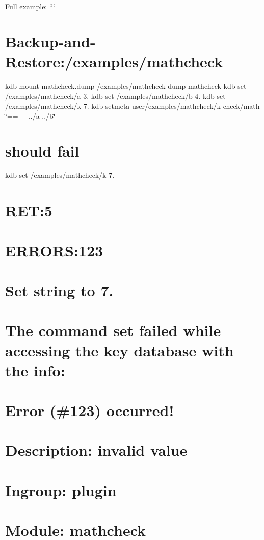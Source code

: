 Full example\+: ``` \section*{Backup-\/and-\/\+Restore\+:/examples/mathcheck}

kdb mount mathcheck.\+dump /examples/mathcheck dump mathcheck kdb set /examples/mathcheck/a 3. kdb set /examples/mathcheck/b 4. kdb set /examples/mathcheck/k 7. kdb setmeta user/examples/mathcheck/k check/math \char`\"{}== + ../a ../b\char`\"{} \section*{should fail}

kdb set /examples/mathcheck/k 7. \section*{R\+E\+T\+:5}

\section*{E\+R\+R\+O\+R\+S\+:123}

\section*{Set string to 7.}

\section*{The command set failed while accessing the key database with the info\+:}

\section*{Error (\#123) occurred!}

\section*{Description\+: invalid value}

\section*{Ingroup\+: plugin}

\section*{Module\+: mathcheck}

